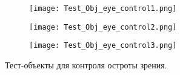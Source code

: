 \begin{figure}[ht]
\centering

    \begin{subfigure}[b]{0.3\textwidth}
    \centering
        \texttt{[image: Test\_Obj\_eye\_control1.png]}
        \caption{}
    \end{subfigure}
    \begin{subfigure}[b]{0.3\textwidth}
    \centering
        \texttt{[image: Test\_Obj\_eye\_control2.png]}
        \caption{}
    \end{subfigure}
    \begin{subfigure}[b]{0.3\textwidth}
    \centering
        \texttt{[image: Test\_Obj\_eye\_control3.png]}
        \caption{}
    \end{subfigure}
    \caption{ Тест-объекты для контроля остроты зрения.}
    \label{fig:TestObjEC}
\end{figure}
